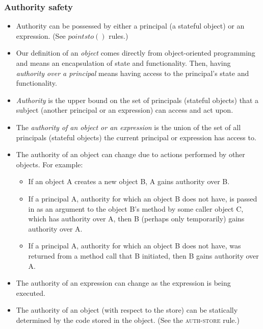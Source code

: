 \documentclass{llncs}
\begin{document}
\subsubsection{Authority safety}

\begin{itemize}
\item Authority can be possessed by either a principal (a stateful object) or an expression. (See $pointsto()$ rules.)

\item Our definition of an \emph{object} comes directly from object-oriented programming and means an encapsulation of state and functionality. Then, having \emph{authority over a principal} means having access to the principal's state and functionality.

\item \emph{Authority} is the upper bound on the set of principals (stateful objects) that a subject (another principal or an expression) can access and act upon.

\item The \emph{authority of an object or an expression} is the union of the set of all principals (stateful objects) the current principal or expression has access to.

\item The authority of an object can change due to actions performed by other objects. For example:
\begin{itemize}
\item If an object A creates a new object B, A gains authority over B.
\item If a principal A, authority for which an object B does not have, is passed in as an argument to the object B's method by some caller object C, which has authority over A, then B (perhaps only temporarily) gains authority over A.
\item If a principal A, authority for which an object B does not have, was returned from a method call that B initiated, then B gains authority over A.
\end{itemize}

\item The authority of an expression can change as the expression is being executed.

\item The authority of an object (with respect to the store) can be statically determined by the code stored in the object. (See the \textsc{auth-store} rule.)

\end{itemize}
\end{document}
